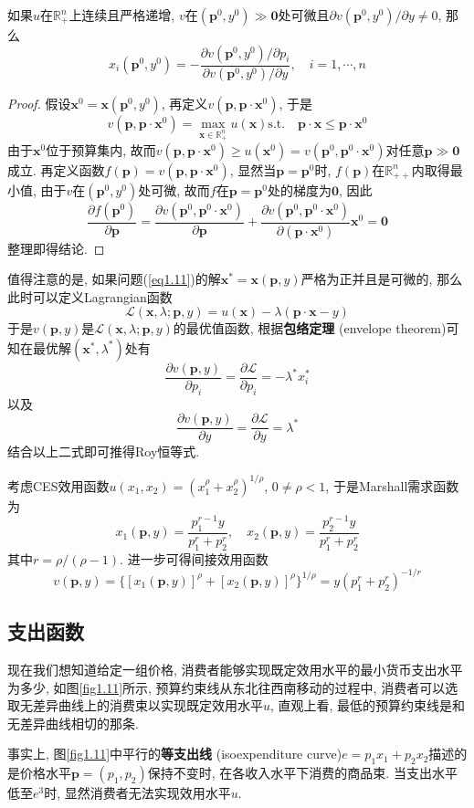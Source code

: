 \documentclass[cn, 12pt, math=mtpro2, bibstyle=apa, blue, twocol]{elegantbook}
\newcommand{\R}{\mathbb{R}}
\newcommand{\p}{\mathbf{p}}
\newcommand{\x}{\mathbf{x}}
\begin{document}
\begin{theorem}[Roy恒等式]
  如果$u$在$\R_+^n$上连续且严格递增, $v$在$(\p^0,y^0)\gg\mathbf{0}$处可微且$\partial v(\p^0,y^0)/\partial y\ne0$, 那么
  $$x_i(\p^0,y^0)=-\frac{\partial v(\p^0,y^0)/\partial p_i}{\partial v(\p^0,y^0)/\partial y},\quad i=1,\cdots,n$$
\end{theorem}
\begin{proof}
  假设$\x^0=\x(\p^0,y^0)$, 再定义$v(\p,\p\cdot\x^0)$, 于是
  $$v(\p,\p\cdot\x^0)=\max_{\x\in\R_+^n}u(\x)\text{s.t.}\quad \p\cdot\x\leq \p\cdot\x^0$$
  由于$\x^0$位于预算集内, 故而$v(\p,\p\cdot\x^0)\geq u(\x^0)=v(\p^0,\p^0\cdot\x^0)$对任意$\p\gg\mathbf{0}$成立. 再定义函数$f(\p)=v(\p,\p\cdot\x^0)$, 显然当$\p=\p^0$时, $f(\p)$在$\R_{++}^n$内取得最小值, 由于$v$在$(\p^0,y^0)$处可微, 故而$f$在$\p=\p^0$处的梯度为$\mathbf{0}$, 因此
  $$\frac{\partial f(\p^0)}{\partial \p}=\frac{\partial v(\p^0,\p^0\cdot\x^0)}{\partial \p}+\frac{\partial v(\p^0,\p^0\cdot\x^0)}{\partial (\p\cdot\x^0)}\x^0=\mathbf{0}$$
  整理即得结论.
\end{proof}
值得注意的是, 如果问题(\ref{eq1.11})的解$\x^\ast=\x(\p,y)$严格为正并且是可微的, 那么此时可以定义Lagrangian函数
$$\mathcal{L}(\x,\lambda;\p,y)=u(\x)-\lambda(\p\cdot\x-y)$$
于是$v(\p,y)$是$\mathcal{L}(\x,\lambda;\p,y)$的最优值函数, 根据\textbf{包络定理} (envelope theorem)可知在最优解$(\x^\ast,\lambda^\ast)$处有
$$\frac{\partial v(\p,y)}{\partial p_i}=\frac{\partial \mathcal{L}}{\partial p_i}=-\lambda^\ast x_i^\ast$$
以及
$$\frac{\partial v(\p,y)}{\partial y}=\frac{\partial \mathcal{L}}{\partial y}=\lambda^\ast$$
结合以上二式即可推得Roy恒等式.

\begin{example}
考虑CES效用函数$u(x_1,x_2)=(x_1^\rho+x_2^\rho)^{1/\rho}$, $0\neq\rho<1$, 于是Marshall需求函数为
$$x_1(\p,y)=\frac{p_1^{r-1}y}{p_1^r+p_2^r},\quad x_2(\p,y)=\frac{p_2^{r-1}y}{p_1^r+p_2^r}$$
其中$r=\rho/(\rho-1)$. 进一步可得间接效用函数
$$v(\p,y)=\{[x_1(\p,y)]^\rho+[x_2(\p,y)]^\rho\}^{1/\rho}=y(p_1^r+p_2^r)^{-1/r}$$
\end{example}
\subsection{支出函数}
现在我们想知道给定一组价格, 消费者能够实现既定效用水平的最小货币支出水平为多少, 如图\ref{fig1.11}所示, 预算约束线从东北往西南移动的过程中, 消费者可以选取无差异曲线上的消费束以实现既定效用水平$u$, 直观上看, 最低的预算约束线是和无差异曲线相切的那条.

事实上, 图\ref{fig1.11}中平行的\textbf{等支出线 }(isoexpenditure curve)$e=p_1x_1+p_2x_2$描述的是价格水平$\p=(p_1,p_2)$保持不变时, 在各收入水平下消费的商品束. 当支出水平低至$e^3$时, 显然消费者无法实现效用水平$u$.
\end{document}
